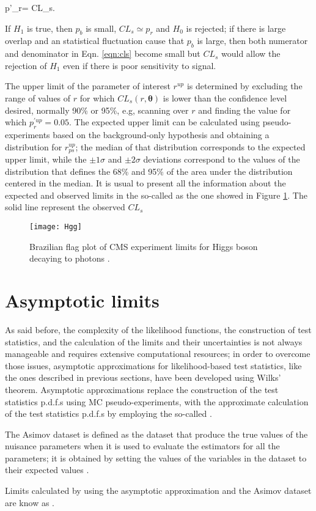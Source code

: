\beqn
p'_r=  \equiv CL_s.\label{eqn:cls}
\eeqn

If $H_1$ is true, then $p_b$ is small, $CL_s\simeq p_r$ and $H_0$ is rejected; if there is large overlap and an statistical fluctuation cause that $p_b$ is large, then both numerator and denominator in Eqn. \ref{eqn:cls} become small but $CL_s$ would allow the rejection of $H_1$ even if there is poor sensitivity to signal.     

The upper limit of the parameter of interest $r^{up}$ is determined by excluding the range of values of $r$ for which $CL_s(r,\bm{\theta})$ is lower than the confidence level desired, normally 90\% or 95\%, e.g, scanning over $r$ and finding the value for which $p_r^{'up}=0.05$. The expected upper limit can be calculated using pseudo-experiments based on the background-only hypothesis and obtaining a distribution for $r^{up}_{ps}$; the median of that distribution corresponds to the expected upper limit, while the $\pm 1\sigma$ and $\pm2\sigma$ deviations correspond to the values of the distribution that defines the 68\% and 95\% of the area under the distribution centered in the median. It is usual to present all the information about the expected and observed limits in the so-called  as the one showed in Figure \ref{fig:hgg}. The solid line represent the observed $CL_s$  

\begin{figure}[!h]
  \centering
  \texttt{[image: Hgg]}
  \caption[Example of Brazilian flag plot]{ Brazilian flag plot of CMS experiment limits for Higgs boson decaying to photons \cite{hgg}.}\label{fig:hgg}
\end{figure}

\section{Asymptotic limits}

As said before, the complexity of the likelihood functions, the construction of test statistics, and the calculation of the limits and their uncertainties is not always manageable and requires extensive computational resources; in order to overcome those issues, asymptotic approximations for likelihood-based test statistics, like the ones described in previous sections, have been developed \cite{wald,asymptotic} using Wilks' theorem. Asymptotic approximations replace the construction of the test statistics p.d.f.s using MC pseudo-experiments, with the approximate calculation of the test statistics p.d.f.s by employing the so-called .

The Asimov dataset is defined as the dataset that produce the true values of the nuisance parameters when it is used to evaluate the estimators for all the parameters; it is obtained by setting the values of the variables in the dataset to their expected values \cite{asymptotic}.

Limits calculated by using the asymptotic approximation and the Asimov dataset are know as .
